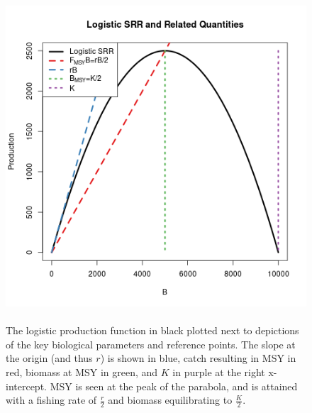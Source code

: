 \documentclass[12pt]{article}
\begin{document}
\begin{figure}[h!]
\begin{minipage}[h!]{0.6\textwidth}
        \includegraphics[width=\textwidth]{./plots/srrSchaeffer.png}	
\end{minipage}
\begin{minipage}[h!]{0.37\textwidth}
\caption{\label{srrSchaefer}
	\\The logistic production function in black plotted next to depictions of the key biological parameters and reference points.
	The slope at the origin (and thus $r$) is shown in blue, catch resulting in MSY in red, biomass at MSY in green, and $K$ in purple at the right x-intercept.	
	MSY is seen at the peak of the parabola, and is attained with a fishing rate of $\frac{r}{2}$ and biomass equilibrating to $\frac{K}{2}$.
}
\end{minipage}
\end{figure}


\end{document}
